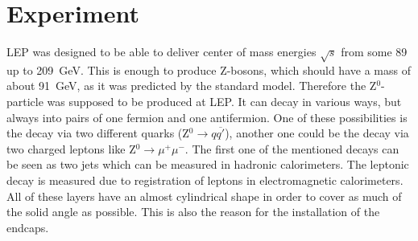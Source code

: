 \documentclass[epj,nopacs]{svjour}
\begin{document}
\section{ Experiment}

LEP was designed to be able to deliver center of mass energies $\sqrt{s}$ from
some 89 up to \SI{209}{\giga\electronvolt}. This is enough to produce Z-bosons,
which should have a mass of about \SI{91}{\giga\electronvolt}, as it was
predicted by the standard model. Therefore the Z$^0$-particle was supposed to be
produced at LEP. It can decay in various ways, but always into pairs of one
fermion and one antifermion. One of these possibilities is the decay via two
different quarks (Z$^0→q\overline{q'}$), another one could be the decay via two
charged leptons like Z$^0→ μ^+μ^-$. The first one of the mentioned decays can be
seen as two jets which can be measured in hadronic calorimeters. The leptonic
decay is measured due to registration of leptons in electromagnetic
calorimeters. All of these layers have an almost cylindrical shape in order to
cover as much of the solid angle as possible. This is also the reason for the
installation of the endcaps.
\end{document}
